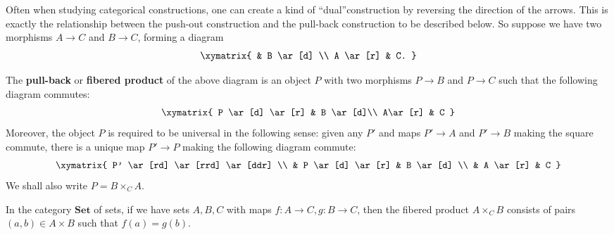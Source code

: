 Often when studying categorical constructions, one can create a kind of
``dual''construction by reversing the direction of the arrows. This is exactly
the
relationship between the push-out construction and the pull-back
construction to be described below.
So suppose we have two morphisms $A \to C$ and $B\to C$, forming a diagram
\[ \xymatrix{
& B \ar[d] \\
A \ar[r] &  C.
}\]
\begin{definition}
The \textbf{pull-back} or \textbf{fibered product} of the above
diagram is an object $P$ with two morphisms $P\to B$ and $P\to
C$ such that the following diagram commutes:
\[ \xymatrix {
P \ar[d] \ar[r] & B \ar[d]\\
A\ar[r] & C }\]
Moreover, the object $P$ is required  to be universal in the following sense: given any $P'$
and maps $P'\to A$ and $P'\to B$ making the square commute, there is a
unique map
$P'\to P$ making the following diagram commute:
\[
\xymatrix{
 P' \ar[rd] \ar[rrd] \ar[ddr] \\
& P \ar[d] \ar[r] &  B \ar[d] \\
& A \ar[r] &  C }\]
We shall also write $P = B \times_C A$.
\end{definition}


\begin{example} 
In the category $\mathbf{Set}$ of sets, if we have sets $A, B, C$ with maps $f:
A \to C, g: B \to C$, then the fibered product $A \times_C B$ consists of
pairs $(a,b) \in A \times B$ such that $f(a) = g(b)$.  
\end{example} 

